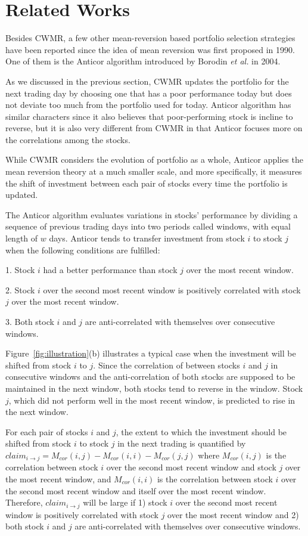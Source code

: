 \section{Related Works}
Besides CWMR, a few other mean-reversion based portfolio selection strategies\cite{UniversalPortfolio, MAFI:MAFI274} have been reported since the idea of mean reversion was first proposed in 1990\cite{mean_reverse}. One of them is the Anticor algorithm introduced by Borodin \emph{et al.} in 2004\cite{AntiCor}.

As we discussed in the previous section, CWMR updates the portfolio for the next trading day by choosing one that has a poor performance today but does not deviate too much from the portfolio used for today. Anticor algorithm has similar characters since it also believes that poor-performing stock is incline to reverse, but it is also very different from CWMR in that Anticor focuses more on the correlations among the stocks.

While CWMR considers the evolution of portfolio as a whole, Anticor applies the mean reversion theory at a much smaller scale, and more specifically, it measures the shift of investment between each pair of stocks every time the portfolio is updated.

The Anticor algorithm evaluates variations in stocks’ performance by dividing a sequence of previous trading days into two periods called windows, with equal length of $w$ days. Anticor tends to transfer investment from stock $i$ to stock $j$ when the following conditions are fulfilled:

1. Stock $i$ had a better performance than stock $j$ over the most recent window.

2. Stock $i$ over the second most recent window is positively correlated with stock $j$ over the most recent window.

3. Both stock $i$ and $j$ are anti-correlated with themselves over consecutive windows.

Figure~\ref{fig:illustration}(b) illustrates a typical case when the investment will be shifted from stock $i$ to $j$. Since the correlation of between stocks $i$ and $j$ in consecutive windows and the anti-correlation of both stocks are supposed to be maintained in the next window, both stocks tend to reverse in the window. Stock $j$, which did not perform well in the most recent window, is predicted to rise in the next window.

For each pair of stocks $i$ and $j$, the extent to which the investment should be shifted from stock $i$ to stock $j$ in the next trading is quantified by $claim_{i\rightarrow j} = M_{cor}(i, j) - M_{cor}(i, i) - M_{cor}(j, j)$ where $M_{cor}(i, j)$ is the correlation between stock $i$ over the second most recent window and stock $j$ over the most recent window, and $M_{cor}(i, i)$ is the correlation between stock $i$ over the second most recent window and itself over the most recent window. Therefore, $claim_{i\rightarrow j}$ will be large if 1) stock $i$ over the second most recent window is positively correlated with stock $j$ over the most recent window and 2) both stock $i$ and $j$ are anti-correlated with themselves over consecutive windows.

